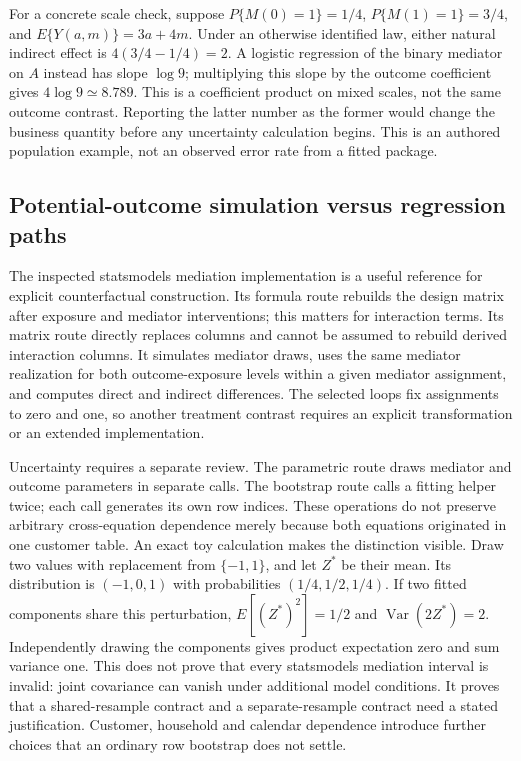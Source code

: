 For a concrete scale check, suppose $P\{M(0)=1\}=1/4$, $P\{M(1)=1\}=3/4$, and $E\{Y(a,m)\}=3a+4m$. Under an otherwise identified law, either natural indirect effect is $4(3/4-1/4)=2$. A logistic regression of the binary mediator on $A$ instead has slope $\log 9$; multiplying this slope by the outcome coefficient gives $4\log9\simeq8.789$. This is a coefficient product on mixed scales, not the same outcome contrast. Reporting the latter number as the former would change the business quantity before any uncertainty calculation begins. This is an authored population example, not an observed error rate from a fitted package.\cite{exec25_pymed_choice}

\subsection{Potential-outcome simulation versus regression paths}
The inspected statsmodels mediation implementation is a useful reference for explicit counterfactual construction. Its formula route rebuilds the design matrix after exposure and mediator interventions; this matters for interaction terms. Its matrix route directly replaces columns and cannot be assumed to rebuild derived interaction columns. It simulates mediator draws, uses the same mediator realization for both outcome-exposure levels within a given mediator assignment, and computes direct and indirect differences. The selected loops fix assignments to zero and one, so another treatment contrast requires an explicit transformation or an extended implementation.\cite{exec25_pymed_statsmodels}

Uncertainty requires a separate review. The parametric route draws mediator and outcome parameters in separate calls. The bootstrap route calls a fitting helper twice; each call generates its own row indices. These operations do not preserve arbitrary cross-equation dependence merely because both equations originated in one customer table. An exact toy calculation makes the distinction visible. Draw two values with replacement from $\{-1,1\}$, and let $Z^*$ be their mean. Its distribution is $(-1,0,1)$ with probabilities $(1/4,1/2,1/4)$. If two fitted components share this perturbation, $E[(Z^*)^2]=1/2$ and $\operatorname{Var}(2Z^*)=2$. Independently drawing the components gives product expectation zero and sum variance one. This does not prove that every statsmodels mediation interval is invalid: joint covariance can vanish under additional model conditions. It proves that a shared-resample contract and a separate-resample contract need a stated justification. Customer, household and calendar dependence introduce further choices that an ordinary row bootstrap does not settle.\cite{exec25_pymed_statsmodels,exec25_pymed_choice}

